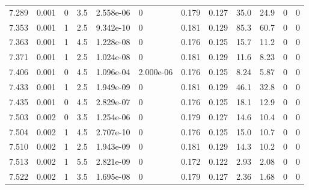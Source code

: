 \documentclass[preview]{standalone}
\begin{document}
{{{{{{{\begin{tabular}{L{1.2cm}C{1.2cm} C{0.3cm}C{0.5cm} C{1.4cm}C{1.4cm} C{1.4cm}C{1.4cm} C{1.6cm}C{1.6cm} C{1.6cm}C{1.6cm}}
  7.289  &  0.001  & 0     & 3.5 &  2.558e-06  & 0  &  0.179&   0.127& 35.0 & 24.9   &  0 & 0  \\ 
  7.353  &  0.001  & 1     & 2.5 &  9.342e-10  & 0  &  0.181&   0.129& 85.3 & 60.7   &  0 & 0  \\ 
  7.363  &  0.001  & 1     & 4.5 &  1.228e-08  & 0  &  0.176&   0.125& 15.7 & 11.2   &  0 & 0  \\ 
  7.371  &  0.001  & 1     & 2.5 &  1.024e-08  & 0  &  0.181&   0.129& 11.6 & 8.23   &  0 & 0  \\ 
  7.406  &  0.001  & 0     & 4.5 &  1.096e-04  & 2.000e-06  &  0.176&   0.125& 8.24 & 5.87   &  0 & 0  \\ 
  7.433  &  0.001  & 1     & 2.5 &  1.949e-09  & 0  &  0.181&   0.129& 46.1 & 32.8   &  0 & 0  \\ 
  7.435  &  0.001  & 0     & 4.5 &  2.829e-07  & 0  &  0.176&   0.125& 18.1 & 12.9   &  0 & 0  \\ 
  7.503  &  0.002  & 0     & 3.5 &  1.254e-06  & 0  &  0.179&   0.127& 14.6 & 10.4   &  0 & 0  \\ 
  7.504  &  0.002  & 1     & 4.5 &  2.707e-10  & 0  &  0.176&   0.125& 15.0 & 10.7   &  0 & 0  \\ 
  7.510  &  0.002  & 1     & 2.5 &  1.943e-09  & 0  &  0.181&   0.129& 14.3 & 10.2   &  0 & 0  \\ 
  7.513  &  0.002  & 1     & 5.5 &  2.821e-09  & 0  &  0.172&   0.122& 2.93 & 2.08   &  0 & 0  \\ 
  7.522  &  0.002  & 1     & 3.5 &  1.695e-08  & 0  &  0.179&   0.127& 2.36 & 1.68   &  0 & 0  \\ 
\hline 
\end{tabular} 

}}}}}}}
\end{document}
